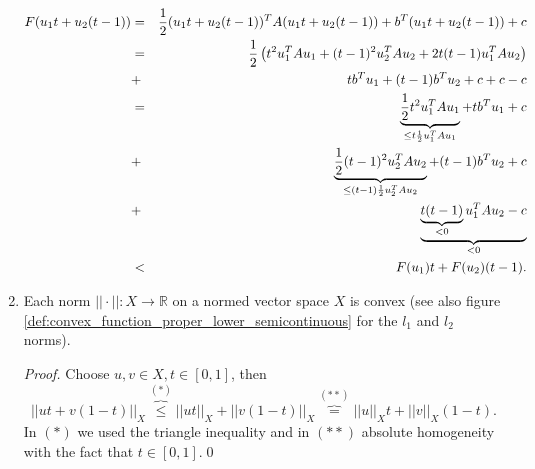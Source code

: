\begin{example}
\begin{enumerate}
                \begin{eqnarray}
                    F(u_{1}t + u_{2}(t-1)) &=& \frac{1}{2} (u_{1}t + u_{2}(t-1))^{T} A (u_{1}t + u_{2}(t-1)) + b^{T} (u_{1}t + u_{2}(t-1)) + c \notag \\
                    &=& \frac{1}{2} \left( t^{2}u_{1}^{T} A u_{1} + (t-1)^{2} u_{2}^{T} A u_{2} + 2 t(t-1) u_{1}^{T} A u_{2} \right) \notag \\
                    &+& t b^{T} u_{1} + (t-1) b^{T} u_{2} + c + c - c \notag \\
                    &=& \underbrace{\frac{1}{2} t^{2}u_{1}^{T} A u_{1}}_{\le t \frac{1}{2} u_{1}^{T} A u_{1}} + t b^{T} u_{1} + c \notag \\
                    &+& \underbrace{\frac{1}{2} (t-1)^{2} u_{2}^{T} A u_{2}}_{\le (t-1) \frac{1}{2} u_{2}^{T} A u_{2}} + (t-1) b^{T} u_{2} + c \notag \\
                    &+& \underbrace{\underbrace{t(t-1)}_{< 0} u_{1}^{T} A u_{2} - c}_{< 0} \notag \\
                    &<& F(u_{1})t + F(u_{2})(t-1).
                \end{eqnarray}
            \item Each norm $||\cdot||: X \longrightarrow \mathbb{R}$ on a normed vector space $X$ is convex (see also figure \ref{def:convex_function_proper_lower_semicontinuous} for the $l_{1}$ and $l_{2}$ norms).
                \begin{proof} %
                    Choose $u, v \in X, t \in [0, 1]$, then
                    $$
                        ||ut + v(1 - t)||_{X} \overbrace{\le}^{(\ast)} ||ut||_{X} + ||v(1 - t)||_{X} \overbrace{=}^{(\ast\ast)} ||u||_{X} t + ||v||_{X} (1 - t).
                    $$
                    In $(\ast)$ we used the triangle inequality and in $(\ast\ast)$ absolute homogeneity with the fact that $t \in [0, 1]$.\qed
                \end{proof}
        \end{enumerate}

    \end{example}

